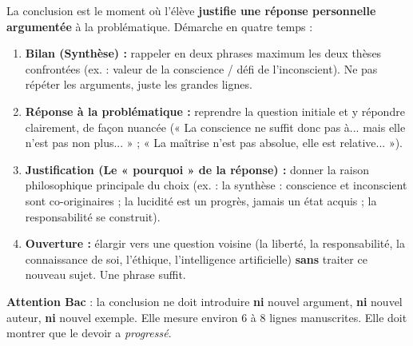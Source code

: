 \documentclass[11pt]{article}
\begin{document}
\begin{methode}
La conclusion est le moment où l'élève \textbf{justifie une réponse personnelle argumentée} à la problématique. Démarche en quatre temps :
\begin{enumerate}
\item \textbf{Bilan (Synthèse) :} rappeler en deux phrases maximum les deux thèses confrontées (ex. : valeur de la conscience / défi de l'inconscient). Ne pas répéter les arguments, juste les grandes lignes.
\item \textbf{Réponse à la problématique :} reprendre la question initiale et y répondre clairement, de façon nuancée (« La conscience ne suffit donc pas à... mais elle n'est pas non plus... » ; « La maîtrise n'est pas absolue, elle est relative... »).
\item \textbf{Justification (Le « pourquoi » de la réponse) :} donner la raison philosophique principale du choix (ex. : la synthèse : conscience et inconscient sont co-originaires ; la lucidité est un progrès, jamais un état acquis ; la responsabilité se construit).
\item \textbf{Ouverture :} élargir vers une question voisine (la liberté, la responsabilité, la connaissance de soi, l'éthique, l'intelligence artificielle) \textbf{sans} traiter ce nouveau sujet. Une phrase suffit.
\end{enumerate}
\textbf{Attention Bac} : la conclusion ne doit introduire \textbf{ni} nouvel argument, \textbf{ni} nouvel auteur, \textbf{ni} nouvel exemple. Elle mesure environ 6 à 8 lignes manuscrites. Elle doit montrer que le devoir a \emph{progressé}.
\end{methode}
\end{document}
